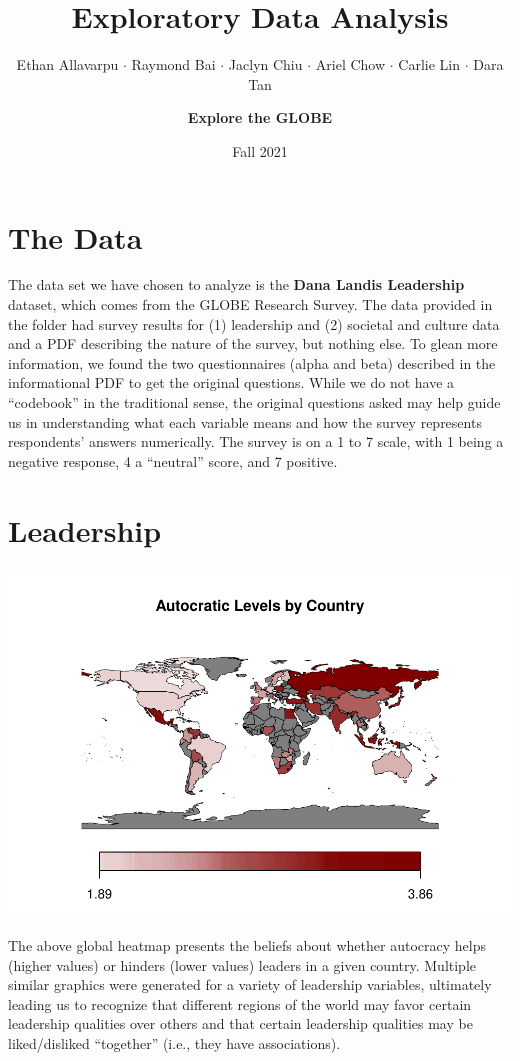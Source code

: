 \documentclass[
]{article}
\title{Exploratory Data Analysis}
\author{Ethan Allavarpu \(\cdot\) Raymond Bai \(\cdot\) Jaclyn Chiu
\(\cdot\) Ariel Chow \(\cdot\) Carlie Lin \(\cdot\) Dara
Tan \and \textbf{Explore the GLOBE}}
\date{Fall 2021}
\begin{document}
\maketitle

\hypertarget{the-data}{%
\section{The Data}\label{the-data}}

The data set we have chosen to analyze is the \textbf{Dana Landis
Leadership} dataset, which comes from the GLOBE Research Survey. The
data provided in the folder had survey results for (1) leadership and
(2) societal and culture data and a PDF describing the nature of the
survey, but nothing else. To glean more information, we found the two
questionnaires (alpha and beta) described in the informational PDF to
get the original questions. While we do not have a ``codebook'' in the
traditional sense, the original questions asked may help guide us in
understanding what each variable means and how the survey represents
respondents' answers numerically. The survey is on a 1 to 7 scale, with
1 being a negative response, 4 a ``neutral'' score, and 7 positive.

\hypertarget{leadership}{%
\section{Leadership}\label{leadership}}

\begin{center}\includegraphics[width=0.95\linewidth]{eda_files/figure-latex/leadership-1} \end{center}

The above global heatmap presents the beliefs about whether autocracy
helps (higher values) or hinders (lower values) leaders in a given
country. Multiple similar graphics were generated for a variety of
leadership variables, ultimately leading us to recognize that different
regions of the world may favor certain leadership qualities over others
and that certain leadership qualities may be liked/disliked ``together''
(i.e., they have associations).
\end{document}
